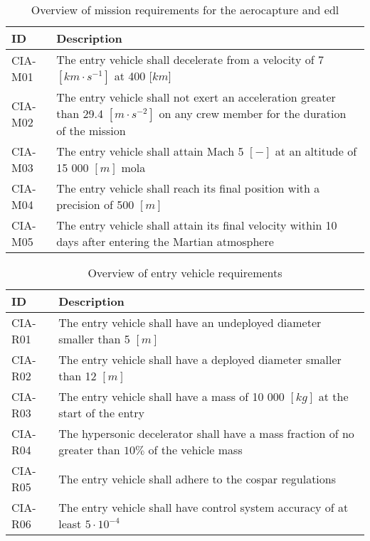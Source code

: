 \begin{table}[h]
	\caption[Overview of mission requirements for the aerocapture and \acrlong{edl}]{Overview of mission requirements for the aerocapture and \gls{edl}}
	\label{tab:misreq} 
	\begin{tabular}{|p{}|p{}|}
    \hline
    \textbf{ID}          & \textbf{Description}                                                                                                      \\ \hline \hline
    CIA-M01& The entry vehicle shall decelerate from a velocity of 7 $[km\cdot s ^{-1}]$ at 400 [$km$]  \\ \hline
    CIA-M02 & The entry vehicle shall not exert an acceleration greater than 29.4 $[m \cdot s^{-2}]$ on any crew member for the duration of the mission			\\ \hline
    	CIA-M03 & The entry vehicle shall attain Mach 5 $[-]$ at an altitude of 15 000 $[m]$  \gls{mola} \\ \hline
    	CIA-M04 & The entry vehicle shall reach its final position with a precision of 500 $[m]$\\ \hline
    	CIA-M05 & The entry vehicle shall attain its final velocity within 10 days after entering the Martian atmosphere \\ \hline
    \end{tabular}
\end{table}

\begin{table}[h]
	\caption{Overview of entry vehicle requirements} 
	\label{tab:vehreq}
	\begin{tabular}{|p{}|p{}|}
		\hline
		\textbf{ID}          & \textbf{Description}                                                                                                     \\ \hline \hline
		CIA-R01 & The entry vehicle shall have an undeployed diameter smaller than 5 $[m]$                         				            \\ \hline
		CIA-R02 & The entry vehicle shall have a deployed diameter smaller than 12 $[m]$                         				            \\ \hline	
		CIA-R03 & The entry vehicle shall have a mass of 10 000 $[kg]$ at the start of the entry                       				            \\ \hline
		CIA-R04 & The hypersonic decelerator shall have a mass fraction of no greater than $10\%$ of the vehicle mass  \\ \hline
		CIA-R05 &  The entry vehicle shall adhere to the \gls{cospar} regulations \\ \hline
		CIA-R06 &  The entry vehicle shall have control system accuracy of at least $5\cdot 10^{-4}$  \\ \hline
	\end{tabular}
\end{table}

